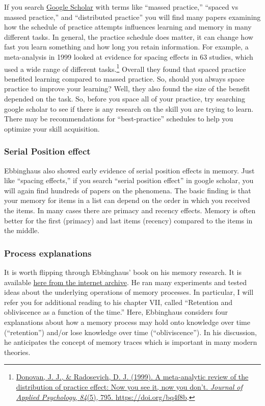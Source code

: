 \documentclass[
  oneside,
  12pt]{crumpbook}
\begin{document}
If you search \href{https://scholar.google.com/}{Google Scholar} with terms like ``massed practice,'' ``spaced vs massed practice,'' and ``distributed practice'' you will find many papers examining how the schedule of practice attempts influences learning and memory in many different tasks. In general, the practice schedule does matter, it can change how fast you learn something and how long you retain information. For example, a meta-analysis in 1999 looked at evidence for spacing effects in 63 studies, which used a wide range of different tasks.\footnote{\protect\hyperlink{ref-donovanMetaanalyticReviewDistribution1999}{Donovan, J. J., \& Radosevich, D. J. (1999). A meta-analytic review of the distribution of practice effect: {Now} you see it, now you don't. \emph{Journal of Applied Psychology}, \emph{84}(5), 795. \url{https://doi.org/bq4f8b}}.} Overall they found that spaced practice benefited learning compared to massed practice. So, should you always space practice to improve your learning? Well, they also found the size of the benefit depended on the task. So, before you space all of your practice, try searching google scholar to see if there is any research on the skill you are trying to learn. There may be recommendations for ``best-practice'' schedules to help you optimize your skill acquisition.

\hypertarget{serial-position-effect}{%
\subsubsection{Serial Position effect}\label{serial-position-effect}}

Ebbinghaus also showed early evidence of serial position effects in memory. Just like ``spacing effects,'' if you search ``serial position effect'' in google scholar, you will again find hundreds of papers on the phenomena. The basic finding is that your memory for items in a list can depend on the order in which you received the items. In many cases there are primacy and recency effects. Memory is often better for the first (primacy) and last items (recency) compared to the items in the middle.

\hypertarget{process-explanations}{%
\subsubsection{Process explanations}\label{process-explanations}}

It is worth flipping through Ebbinghaus' book on his memory research. It is available \href{https://archive.org/details/memorycontributi00ebbiuoft}{here from the internet archive}. He ran many experiments and tested ideas about the underlying operations of memory processes. In particular, I will refer you for additional reading to his chapter VII, called ``Retention and obliviscence as a function of the time.'' Here, Ebbinghaus considers four explanations about how a memory process may hold onto knowledge over time (``retention'') and/or lose knowledge over time (``obliviscence''). In his discussion, he anticipates the concept of memory traces which is important in many modern theories.
\end{document}
